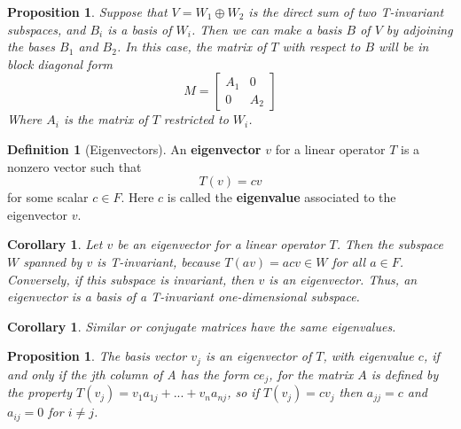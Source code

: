 \documentclass[12pt]{article}
\newtheorem{cor}[thm]{Corollary}
\newtheorem{prop}[thm]{Proposition}
\theoremstyle{definition}
\newtheorem{defn}[thm]{Definition}
\theoremstyle{remark}
\numberwithin{equation}{section}
\newcommand\B[1]{\textbf{ #1}}
\begin{document}
\vspace{15pt}

\begin{prop}
        Suppose that $V = W_1 \oplus W_2$ is the direct sum of two T-invariant subspaces, and $B_i$ is a basis of $W_i$. Then we can make a basis $B$ of $V$ by adjoining the bases $B_1$ and $B_2$. In this case, the matrix of $T$ with respect to $B$ will be in block diagonal form \begin{equation}
                M = \begin{bmatrix} A_1 & 0 \\ 0 & A_2 \end{bmatrix}
        \end{equation}
        Where $A_i$ is the matrix of $T$ restricted to $W_i$.
\end{prop}


\vspace{15pt}

\begin{defn}[Eigenvectors]
        An \B{eigenvector} $v$ for a linear operator $T$ is a nonzero vector such that \begin{equation}
                T(v) = cv
        \end{equation}
        for some scalar $c \in F$. Here $c$ is called the \B{eigenvalue} associated to the eigenvector $v$.
\end{defn}

\vspace{15pt}

\begin{cor}
        Let $v$ be an eigenvector for a linear operator $T$. Then the subspace $W$ spanned by $v$ is T-invariant, because $T(av) = acv \in W$ for all $a \in F$. Conversely, if this subspace is invariant, then $v$ is an eigenvector. Thus, an eigenvector is a basis of a T-invariant one-dimensional subspace.
\end{cor}

\vspace{15pt}

\begin{cor}
        Similar or conjugate matrices have the same eigenvalues.
\end{cor}

\vspace{15pt}


\begin{prop}
        The basis vector $v_j$ is an eigenvector of $T$, with eigenvalue $c$, if and only if the jth column of A has the form $ce_j$, for the matrix $A$ is defined by the property $T(v_j) = v_1a_{1j}+...+v_na_{nj}$, so if $T(v_j) = cv_j$ then $a_{jj} = c$ and $a_{ij} = 0$ for $i \neq j$.
\end{prop}
\end{document}
